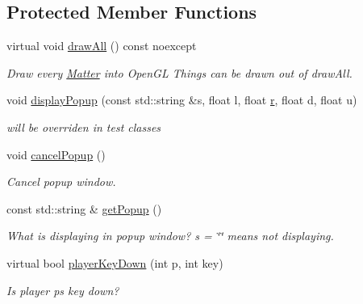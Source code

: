 \subsection*{Protected Member Functions}
\begin{DoxyCompactItemize}
\item 
virtual void \hyperlink{classWorld_a2cc743491ca1c39add8c1298c6f0778d}{draw\+All} () const noexcept
\begin{DoxyCompactList}\small\item\em Draw every \hyperlink{classMatter}{Matter} into Open\+G\+L Things can be drawn out of draw\+All. \end{DoxyCompactList}\item 
void \hyperlink{classWorld_a6c2c794397ae3dad108e43caae240adb}{display\+Popup} (const std\+::string \&s, float l, float \hyperlink{image_8h_a62969232668331297e2dca1ae2ddd10d}{r}, float d, float u)
\begin{DoxyCompactList}\small\item\em will be overriden in test classes \end{DoxyCompactList}\item 
void \hyperlink{classWorld_aa8d19774db3f3833896990b57ad8eacc}{cancel\+Popup} ()
\begin{DoxyCompactList}\small\item\em Cancel popup window. \end{DoxyCompactList}\item 
const std\+::string \& \hyperlink{classWorld_a30d3c544a65693194b705689970842e3}{get\+Popup} ()
\begin{DoxyCompactList}\small\item\em What is displaying in popup window? s = \char`\"{}\char`\"{} means not displaying. \end{DoxyCompactList}\item 
virtual bool \hyperlink{classWorld_a13622f99e647f20c7704b8857651323c}{player\+Key\+Down} (int p, int key)
\begin{DoxyCompactList}\small\item\em Is player p\textquotesingle{}s key down? \end{DoxyCompactList}\end{DoxyCompactItemize}

